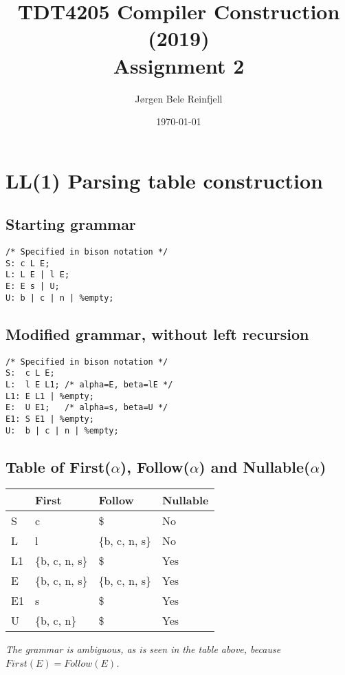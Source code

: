 \documentclass[11pt]{article}
\author{Jørgen Bele Reinfjell}
\date{\today}
\title{TDT4205 Compiler Construction (2019)\\\medskip
\large Assignment 2}
\begin{document}
\maketitle

\section{LL(1) Parsing table construction}
\label{sec:org3396e20}
\subsection{Starting grammar}
\label{sec:org6fb288c}
\begin{verbatim}
/* Specified in bison notation */
S: c L E;
L: L E | l E;
E: E s | U;
U: b | c | n | %empty;
\end{verbatim}

\subsection{Modified grammar, without left recursion}
\label{sec:org23492de}
\begin{verbatim}
/* Specified in bison notation */
S:  c L E;
L:  l E L1; /* alpha=E, beta=lE */
L1: E L1 | %empty;
E:  U E1;   /* alpha=s, beta=U */
E1: S E1 | %empty;
U:  b | c | n | %empty;
\end{verbatim}

\subsection{Table of First(\(\alpha\)), Follow(\(\alpha\)) and Nullable(\(\alpha\))}
\label{sec:org6fe8868}
\begin{center}
\begin{tabular}{llll}
 & First & Follow & Nullable\\
\hline
S & c & \$ & No\\
L & l & \{b, c, n, s\} & No\\
L1 & \{b, c, n, s\} & \$ & Yes\\
E & \{b, c, n, s\} & \{b, c, n, s\} & Yes\\
E1 & s & \$ & Yes\\
U & \{b, c, n\} & \$ & Yes\\
\end{tabular}
\end{center}


\emph{The grammar is ambiguous, as is seen in the table above,
because \(First(E) = Follow(E)\).}
\end{document}
